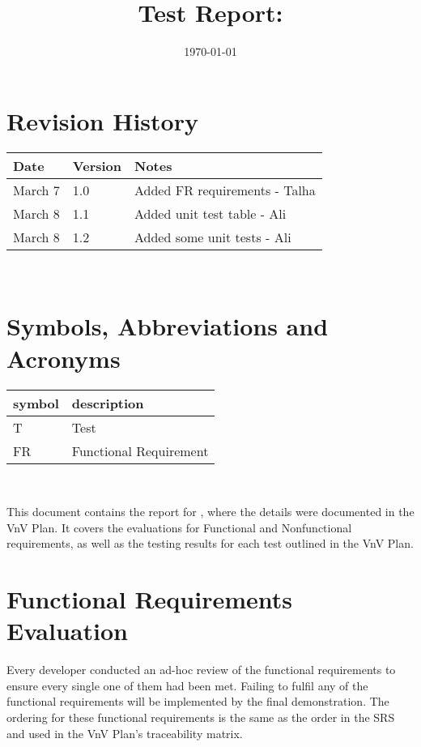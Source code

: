 \documentclass[12pt, titlepage]{article}
\begin{document}
\title{Test Report: \progname} 
\author{\authname}
\date{\today}
	
\maketitle


\section{Revision History}

\begin{tabularx}{\textwidth}{p{3cm}p{2cm}X}
\toprule {\bf Date} & {\bf Version} & {\bf Notes}\\
\midrule
March 7 & 1.0 & Added FR requirements - Talha\\
March 8 & 1.1 & Added unit test table - Ali\\
March 8 & 1.2 & Added some unit tests - Ali\\
\bottomrule
\end{tabularx}

~\newpage

\section{Symbols, Abbreviations and Acronyms}

\renewcommand{\arraystretch}{1.2}
\begin{tabular}{l l} 
  \toprule		
  \textbf{symbol} & \textbf{description}\\
  \midrule 
  T & Test\\
  FR & Functional Requirement\\
  \bottomrule
\end{tabular}\\

\newpage

\tableofcontents

\listoftables %

\listoffigures %

\newpage


This document contains the report for \progname , where the details were documented in the VnV Plan. It covers the evaluations for Functional and Nonfunctional requirements, as well as the testing results for each test outlined in the VnV Plan.

\section{Functional Requirements Evaluation}
Every developer conducted an ad-hoc review of the functional requirements to ensure every single one of them had been met. Failing to fulfil any of the functional requirements will be implemented by the final demonstration. The ordering for these functional requirements is the same as the order in the SRS and used in the VnV Plan's traceability matrix.
\end{document}
